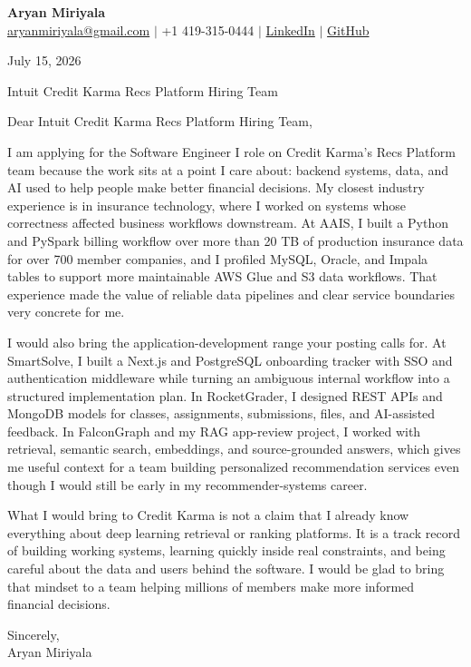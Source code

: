 \documentclass[letterpaper,11pt]{article}
\begin{document}
{\Large\textbf{Aryan Miriyala}}\\
\href{mailto:aryanmiriyala@gmail.com}{aryanmiriyala@gmail.com} $|$ +1 419-315-0444 $|$
\href{https://www.linkedin.com/in/aryan-miriyala-7788a21b6/}{LinkedIn} $|$
\href{https://github.com/aryanmiriyala}{GitHub}

July 15, 2026

Intuit Credit Karma Recs Platform Hiring Team

Dear Intuit Credit Karma Recs Platform Hiring Team,

I am applying for the Software Engineer I role on Credit Karma's Recs Platform team because the work sits at a point I care about: backend systems, data, and AI used to help people make better financial decisions. My closest industry experience is in insurance technology, where I worked on systems whose correctness affected business workflows downstream. At AAIS, I built a Python and PySpark billing workflow over more than 20 TB of production insurance data for over 700 member companies, and I profiled MySQL, Oracle, and Impala tables to support more maintainable AWS Glue and S3 data workflows. That experience made the value of reliable data pipelines and clear service boundaries very concrete for me.

I would also bring the application-development range your posting calls for. At SmartSolve, I built a Next.js and PostgreSQL onboarding tracker with SSO and authentication middleware while turning an ambiguous internal workflow into a structured implementation plan. In RocketGrader, I designed REST APIs and MongoDB models for classes, assignments, submissions, files, and AI-assisted feedback. In FalconGraph and my RAG app-review project, I worked with retrieval, semantic search, embeddings, and source-grounded answers, which gives me useful context for a team building personalized recommendation services even though I would still be early in my recommender-systems career.

What I would bring to Credit Karma is not a claim that I already know everything about deep learning retrieval or ranking platforms. It is a track record of building working systems, learning quickly inside real constraints, and being careful about the data and users behind the software. I would be glad to bring that mindset to a team helping millions of members make more informed financial decisions.

Sincerely,\\
Aryan Miriyala
\end{document}
